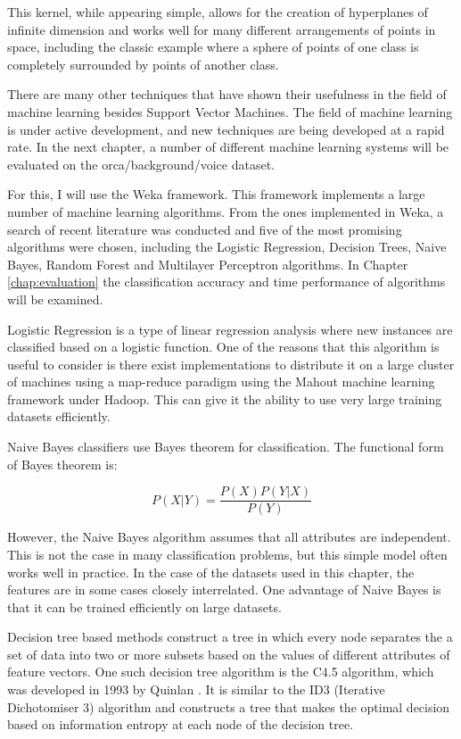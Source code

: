 This kernel, while appearing simple, allows for the creation of
hyperplanes of infinite dimension and works well for many different
arrangements of points in space, including the classic example where a
sphere of points of one class is completely surrounded by points of
another class.

There are many other techniques that have shown their usefulness in
the field of machine learning besides Support Vector Machines.  The
field of machine learning is under active development, and new
techniques are being developed at a rapid rate.  In the next chapter,
a number of different machine learning systems will be evaluated on
the orca/background/voice dataset.

For this, I will use the Weka \cite{witten2005weka} framework.  This
framework implements a large number of machine learning algorithms.
From the ones implemented in Weka, a search of recent literature was
conducted and five of the most promising algorithms were chosen,
including the Logistic Regression, Decision Trees, Naive Bayes, Random
Forest and Multilayer Perceptron algorithms.  In Chapter
\ref{chap:evaluation} the classification accuracy and time performance
of algorithms will be examined.

Logistic Regression \cite{lecessie1992logisitic} is a type of linear
regression analysis where new instances are classified based on a
logistic function.  One of the reasons that this algorithm is useful
to consider is there exist implementations to distribute it on a large
cluster of machines using a map-reduce paradigm \cite{khuc2012towards}
using the Mahout machine learning framework under Hadoop.  This can
give it the ability to use very large training datasets efficiently.

Naive Bayes classifiers \cite{john1995estimating} use Bayes theorem
for classification.  The functional form of Bayes theorem is:

\begin{equation} 
P(X|Y) = \frac{P(X)P(Y|X)}{P(Y)} 
\end{equation}

However, the Naive Bayes algorithm assumes that all attributes are
independent.  This is not the case in many classification problems,
but this simple model often works well in practice.  In the case of
the datasets used in this chapter, the features are in some cases
closely interrelated.  One advantage of Naive Bayes is that it can be
trained efficiently on large datasets.

Decision tree based methods construct a tree in which every node
separates the a set of data into two or more subsets based on the
values of different attributes of feature vectors. One such decision
tree algorithm is the C4.5 algorithm, which was developed in 1993 by
Quinlan \cite{quinlan1993c45}.  It is similar to the ID3 (Iterative
Dichotomiser 3) algorithm \cite{quinlan1986induction} and constructs a tree that makes
the optimal decision based on information entropy at each node of the
decision tree.

